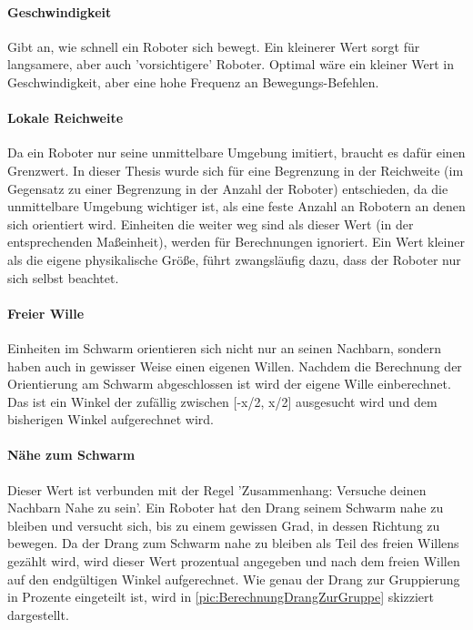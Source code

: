 \paragraph*{Geschwindigkeit} Gibt an, wie schnell ein Roboter sich bewegt. Ein kleinerer Wert sorgt für langsamere, aber auch 'vorsichtigere' Roboter. Optimal wäre ein kleiner Wert in Geschwindigkeit, aber eine hohe Frequenz an Bewegungs-Befehlen.

\paragraph*{Lokale Reichweite} Da ein Roboter nur seine unmittelbare Umgebung imitiert, braucht es dafür einen Grenzwert. In dieser Thesis wurde sich für eine Begrenzung in der Reichweite (im Gegensatz zu einer Begrenzung in der Anzahl der Roboter) entschieden, da die unmittelbare Umgebung wichtiger ist, als eine feste Anzahl an Robotern an denen sich orientiert wird. Einheiten die weiter weg sind als dieser Wert (in der entsprechenden Maßeinheit), werden für Berechnungen ignoriert. Ein Wert kleiner als die eigene physikalische Größe, führt zwangsläufig dazu, dass der Roboter nur sich selbst beachtet.

\paragraph*{Freier Wille} Einheiten im Schwarm orientieren sich nicht nur an seinen Nachbarn, sondern haben auch in gewisser Weise einen eigenen Willen. Nachdem die Berechnung der Orientierung am Schwarm abgeschlossen ist wird der eigene Wille einberechnet. Das ist ein Winkel der zufällig zwischen [-x/2, x/2] ausgesucht wird und dem bisherigen Winkel aufgerechnet wird.

\paragraph*{Nähe zum Schwarm} Dieser Wert ist verbunden mit der Regel 'Zusammenhang: Versuche deinen Nachbarn Nahe zu sein'. Ein Roboter hat den Drang seinem Schwarm nahe zu bleiben und versucht sich, bis zu einem gewissen Grad, in dessen Richtung zu bewegen. Da der Drang zum Schwarm nahe zu bleiben als Teil des freien Willens gezählt wird, wird dieser Wert prozentual angegeben und nach dem freien Willen auf den endgültigen Winkel aufgerechnet. Wie genau der Drang zur Gruppierung in Prozente eingeteilt ist, wird in \autoref{pic:BerechnungDrangZurGruppe} skizziert dargestellt.

